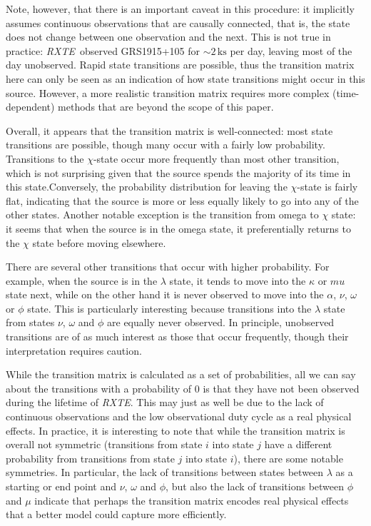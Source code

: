 \documentclass[12pt]{emulateapj}
\newcommand{\project}[1]{\textsl{#1}}
\newcommand{\rxte}{\project{RXTE}}
\begin{document}
Note, however, that there is an important caveat in this procedure: it implicitly assumes continuous observations that are causally connected, that is, the state 
does not change between one observation and the next. This is not true in practice: \rxte\ observed GRS1915+105 for $\sim 2\,\mathrm{ks}$ per day, leaving most 
of the day unobserved. Rapid state transitions are possible, thus the transition matrix here can only be seen as an indication of how state transitions might occur 
in this source. However, a more realistic transition matrix requires more complex (time-dependent) methods that are beyond the scope of this paper.

Overall, it appears that the transition matrix is well-connected: most state transitions are possible, though many occur with a fairly low probability.
Transitions to the $\chi$-state occur more frequently than most other transition, which is not surprising given that the source spends the majority of its time 
in this state.Conversely, the probability distribution for leaving the $\chi$-state is fairly flat, indicating that the source is more or less equally likely to go into any 
of the other states. Another notable exception is the transition from omega to $\chi$ state: it seems that when the source is in the omega state, it preferentially 
returns to the $\chi$ state before moving elsewhere. 

There are several other transitions that occur with higher probability. For example, when the source is in 
the $\lambda$ state, it tends to move into the $\kappa$ or $mu$ state next, while on the other hand it is never observed to move into the $\alpha$, $\nu$, 
$\omega$ or $\phi$ state. This is particularly interesting because transitions into the $\lambda$ state from states $\nu$, $\omega$ and $\phi$ are equally 
never observed. In principle, unobserved transitions are of as much interest as those that occur frequently, though their interpretation requires caution. 

While the transition matrix is calculated as a set of probabilities, all we can say about the transitions with a probability of $0$ is that they have not been observed 
during the lifetime of \rxte. This may just as well be due to the lack of continuous observations and the low observational duty cycle as a real physical effects.
In practice, it is interesting to note that while the transition matrix is overall not symmetric (transitions from state $i$ into state $j$ have a different probability from 
transitions from state $j$ into state $i$), there are some notable symmetries. In particular, the lack of transitions between states between $\lambda$ as a starting 
or end point and $\nu$, $\omega$ and $\phi$, but also the lack of transitions between $\phi$ and $\mu$ indicate that perhaps the transition matrix encodes 
real physical effects that a better model could capture more efficiently.
\end{document}

